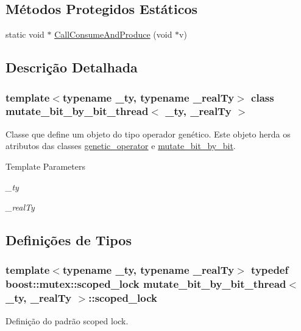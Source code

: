 \subsection*{Métodos Protegidos Estáticos}
\begin{DoxyCompactItemize}
\item 
static void $\ast$ \hyperlink{classmutate__bit__by__bit__thread_a6f3893ebf8126e17b2f45e694811765f}{CallConsumeAndProduce} (void $\ast$v)
\end{DoxyCompactItemize}


\subsection{Descrição Detalhada}
\subsubsection*{template$<$typename \_\-ty, typename \_\-realTy$>$ class mutate\_\-bit\_\-by\_\-bit\_\-thread$<$ \_\-ty, \_\-realTy $>$}

Classe que define um objeto do tipo operador genético. Este objeto herda os atributos das classes \hyperlink{classgenetic__operator}{genetic\_\-operator} e \hyperlink{classmutate__bit__by__bit}{mutate\_\-bit\_\-by\_\-bit}.


\begin{DoxyTemplParams}{Template Parameters}
\item[{\em \_\-ty}]\item[{\em \_\-realTy}]\end{DoxyTemplParams}


\subsection{Definições de Tipos}
\hypertarget{classmutate__bit__by__bit__thread_a059838b054d4de64b20d33d1db7e89c0}{
\subsubsection[{scoped\_\-lock}]{\setlength{\rightskip}{0pt plus 5cm}template$<$typename \_\-ty, typename \_\-realTy$>$ typedef boost::mutex::scoped\_\-lock {\bf mutate\_\-bit\_\-by\_\-bit\_\-thread}$<$ \_\-ty, \_\-realTy $>$::{\bf scoped\_\-lock}}}
\label{classmutate__bit__by__bit__thread_a059838b054d4de64b20d33d1db7e89c0}
Definição do padrão scoped lock. 

